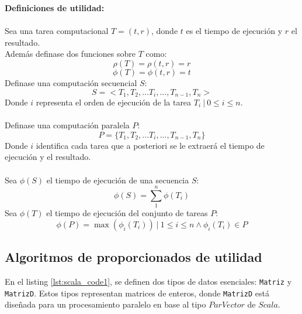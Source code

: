 \documentclass[12pt, a4paper]{article}
\begin{document}
\textbf{Definiciones de utilidad:}\\ \\
Sea una tarea computacional $T=(t,r)$, donde $t$ es el tiempo de ejecución y $r$ el resultado.\\
Además definase dos funciones sobre $T$ como:
\begin{equation}
     \rho(T)= \rho(t,r) = r
\end{equation}
\begin{equation}
      \phi(T)= \phi(t,r) = t
\end{equation}
Definase una computación secuencial $S$: 
\begin{equation}
    S=<T_1,T_2,...T_i,...,T_{n-1},T_{n}>
\end{equation}
Donde $i$ representa el orden de ejecución de la tarea $T_i~ |~  0 \leq i \leq n$.\\ \\
Definase una computación paralela $P$:
\begin{equation}
    P=\{T_1,T_2,...T_i,...,T_{n-1},T_{n}\}
\end{equation}
Donde $i$ identifica cada tarea que a posteriori se le extraerá el tiempo de ejecución y el resultado.\\ \\
Sea $\phi(S)$ el tiempo de ejecución de una secuencia $S$:
\begin{equation}
    \phi(S)= \sum_{1}^{n}\phi(T_i)
\end{equation}
Sea $\phi(T)$ el tiempo de ejecución del conjunto de tareas $P$:
\begin{equation}
    \phi(P)= \max (\phi_i(T_i)) ~ | ~ 1 \leq i \leq n \land \phi_i(T_i) \in P
\end{equation}
\subsection{Algoritmos de proporcionados de utilidad}
En el listing \ref{lst:scala_code1}, se definen dos tipos de datos esenciales: \texttt{Matriz} y \texttt{MatrizD}. Estos tipos representan matrices de enteros, donde \texttt{MatrizD} está diseñada para un procesamiento paralelo en base al tipo $ParVector$ de $Scala$.
\end{document}
